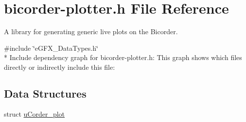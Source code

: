 \hypertarget{bicorder-plotter_8h}{}\section{bicorder-\/plotter.h File Reference}
\label{bicorder-plotter_8h}


A library for generating generic live plots on the Bicorder.  


{\ttfamily \#include \char`\"{}e\+G\+F\+X\+\_\+\+Data\+Types.\+h\char`\"{}}\\*
Include dependency graph for bicorder-\/plotter.h\+:
This graph shows which files directly or indirectly include this file\+:
\subsection*{Data Structures}
\begin{DoxyCompactItemize}
\item 
struct \hyperlink{structuCorder__plot}{u\+Corder\+\_\+plot}
\end{DoxyCompactItemize}
